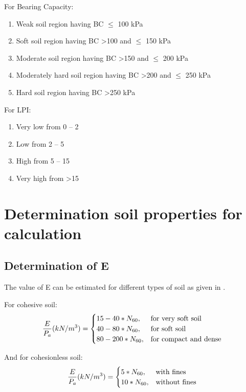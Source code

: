 For Bearing Capacity:
\begin{enumerate}
\item{Weak soil region having BC $\le$ 100 kPa}
\item{Soft soil region having BC \textgreater 100 and $\le$ 150 kPa}
\item{Moderate soil region having BC \textgreater 150 and $\le$ 200 kPa}
\item{Moderately hard soil region having BC \textgreater 200 and $\le$ 250 kPa}
\item{Hard soil region having BC \textgreater 250 kPa}
\end{enumerate}

For LPI:
\begin{enumerate}
\item{Very low from 0 – 2}
\item{Low from 2 – 5}
\item{High from 5 – 15}
\item{Very high from \textgreater 15}
\end{enumerate}

\section{Determination soil properties for calculation}
\subsection{Determination of E}
The value of E can be estimated for different types of soil as given in \cite{kulhawy_manual_1990}.
\par
For cohesive soil:
\begin{equation}
\frac{E}{P_a}(kN/m^3)= \begin{cases}
    15-40 * N_{60}, & \text{for very soft soil}\\
    40-80 * N_{60}, & \text{for soft soil}\\
    80-200 * N_{60}, & \text{for compact and dense}
    \end{cases}\\
\end{equation}
\par
And for cohesionless soil:
\begin{equation}
\frac{E}{P_a}(kN/m^3)= \begin{cases}
    5 * N_{60}, & \text{with fines}\\
    10 * N_{60}, & \text{without fines}
    \end{cases}\\
\end{equation}

